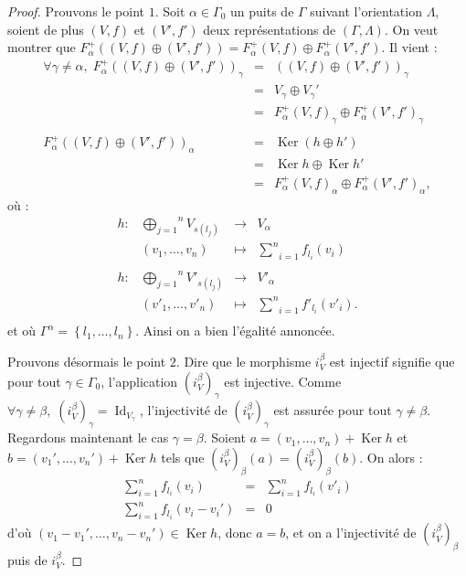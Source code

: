 \documentclass[a4paper,10pt]{article}
\DeclareMathOperator{\Ker}{Ker}
\DeclareMathOperator{\Id}{Id}
\begin{document}
\begin{proof}
	Prouvons le point $1$. Soit $\alpha\in\Gamma_{0}$ un puits de $\Gamma$ suivant l'orientation $\Lambda$, soient de plus $(V,f)$ et $(V',f')$ deux représentations de $(\Gamma,\Lambda)$. On veut montrer que $F_{\alpha}^{+}((V,f)\oplus(V',f'))=F_{\alpha}^{+}(V,f)\oplus F_{\alpha}^{+}(V',f')$. Il vient :
	\[
\begin{array}{rll}
	\forall\gamma\neq\alpha,\;F_{\alpha}^{+}((V,f)\oplus(V',f'))_{\gamma}&=&((V,f)\oplus(V',f'))_{\gamma}\\
	&=& V_{\gamma}\oplus V_{\gamma}'\\
	&=&  F_{\alpha}^{+}(V,f)_{\gamma}\oplus F_{\alpha}^{+}(V',f')_{\gamma}\\
	&&\\
	F_{\alpha}^{+}((V,f)\oplus(V',f'))_{\alpha}&=&\Ker(h\oplus h')\\
	&=& \Ker h \oplus \Ker h'\\
	&=&  F_{\alpha}^{+}(V,f)_{\alpha}\oplus F_{\alpha}^{+}(V',f')_{\alpha},
\end{array}
	\]
où :
\[
\begin{array}{lccc}
	h : & \overset{n}{\underset{j=1}{\bigoplus}}V_{s(l_{j})}&\rightarrow & V_{\alpha} \\ 
	& (v_{1},\dots,v_{n})&\mapsto & \underset{i=1}{\overset{n}{\sum}}f_{l_{i}}(v_{i})\\
	&&&\\
	h : & \overset{n}{\underset{j=1}{\bigoplus}}V'_{s(l_{j})}&\rightarrow & V'_{\alpha} \\ 
	& (v'_{1},\dots,v'_{n})&\mapsto & \underset{i=1}{\overset{n}{\sum}}f'_{l_{i}}(v'_{i}).\\
\end{array}
	\]
	et où $\Gamma^{\alpha}=\left\{ l_{1},\dots,l_{n} \right\}$. Ainsi on a bien l'égalité annoncée.

	Prouvons désormais le point $2$. Dire que le morphisme $i_{V}^{\beta}$ est injectif signifie que pour tout $\gamma\in\Gamma_{0}$, l'application $(i_{V}^{\beta})_{\gamma}$ est injective. Comme $\forall\gamma\neq\beta,\;(i_{V}^{\beta})_{\gamma}=\Id_{V_{\gamma}}$, l'injectivité de $(i_{V}^{\beta})_{\gamma}$ est assurée pour tout $\gamma\neq\beta$. Regardons maintenant le cas $\gamma=\beta$. Soient $a=(v_{1},\dots,v_{n})+\Ker h$ et $b=(v_{1}',\dots,v_{n}')+\Ker h$ tels que $(i_{V}^{\beta})_{\beta}(a)=(i_{V}^{\beta})_{\beta}(b)$. On alors :
	\[
\begin{array}{rll}
	\sum_{i=1}^{n}f_{l_{i}}(v_{i})&=&\sum_{i=1}^{n}f_{l_{i}}(v'_{i})\\
	\sum_{i=1}^{n}f_{l_{i}}(v_{i}-v_{i}')&=&0
\end{array}
	\]
	d'où $(v_{1}-v_{1}',\dots,v_{n}-v_{n}')\in\Ker h$, donc $a=b$, et on a l'injectivité de $(i_{V}^{\beta})_{\beta}$ puis de $i_{V}^{\beta}$.
\end{proof}
\clearpage


\end{document}
